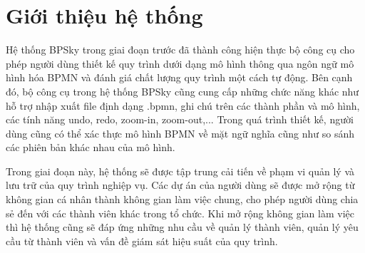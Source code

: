 \section{Giới thiệu hệ thống}
Hệ thống BPSky trong giai đoạn trước đã thành công hiện thực bộ công cụ cho phép người dùng thiết kế quy trình dưới dạng mô hình thông qua ngôn ngữ mô hình hóa BPMN và đánh giá chất lượng quy trình một cách tự động. Bên cạnh đó, bộ công cụ trong hệ thống BPSky cũng cung cấp những chức năng khác như hỗ trợ nhập xuất file định dạng .bpmn, ghi chú trên các thành phần và mô hình, các tính năng undo, redo, zoom-in, zoom-out,... Trong quá trình thiết kế, người dùng cũng có thể xác thực mô hình BPMN về mặt ngữ nghĩa cũng như so sánh các phiên bản khác nhau của mô hình.
\par
Trong giai đoạn này, hệ thống sẽ được tập trung cải tiến về phạm vi quản lý và lưu trữ của quy trình nghiệp vụ. Các dự án của người dùng sẽ được mở rộng từ không gian cá nhân thành không gian làm việc chung, cho phép người dùng chia sẻ đến với các thành viên khác trong tổ chức. Khi mở rộng không gian làm việc thì hệ thống cũng sẽ đáp ứng những nhu cầu về quản lý thành viên, quản lý yêu cầu từ thành viên và vấn đề giám sát hiệu suất của quy trình.

